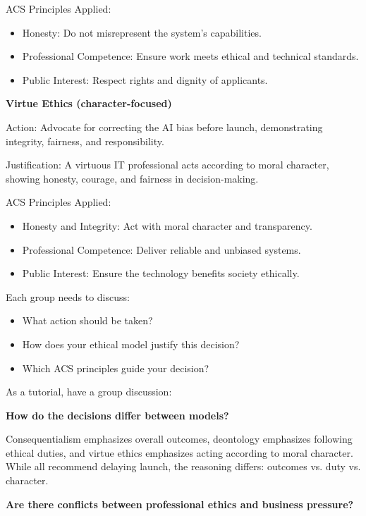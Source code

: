 ACS Principles Applied:

\begin{itemize}
    \item Honesty: Do not misrepresent the system’s capabilities.
    \item Professional Competence: Ensure work meets ethical and technical standards.
    \item Public Interest: Respect rights and dignity of applicants.
\end{itemize}

\noindent\textbf{Virtue Ethics (character-focused)}

Action: Advocate for correcting the AI bias before launch, demonstrating integrity, fairness, and responsibility.

Justification: A virtuous IT professional acts according to moral character, showing honesty, courage, and fairness in decision-making.

ACS Principles Applied:
\begin{itemize}
    \item Honesty and Integrity: Act with moral character and transparency.
    \item Professional Competence: Deliver reliable and unbiased systems.
    \item Public Interest: Ensure the technology benefits society ethically.
\end{itemize}

Each group needs to discuss:

\begin{itemize}
    \item What action should be taken?
    \item How does your ethical model justify this decision?
    \item Which ACS principles guide your decision?
\end{itemize}

\bigskip

As a tutorial, have a group discussion:

\noindent\textbf{How do the decisions differ between models?}

Consequentialism emphasizes overall outcomes, deontology emphasizes following ethical duties, and virtue ethics emphasizes acting according to moral character. While all recommend delaying launch, the reasoning differs: outcomes vs. duty vs. 
character.

\noindent\textbf{Are there conflicts between professional ethics and business pressure?}

